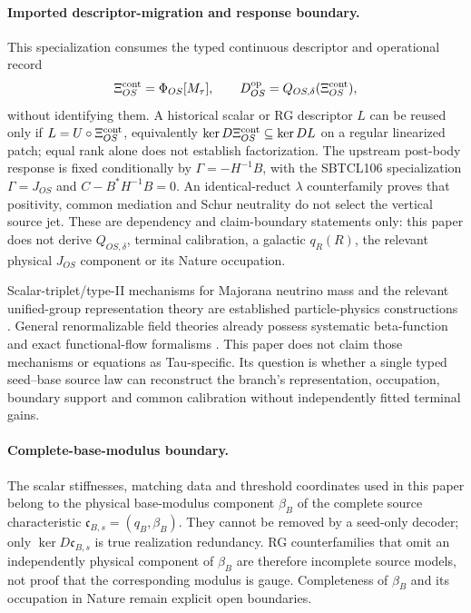 \documentclass[11pt]{article}
\begin{document}
\paragraph{Imported descriptor-migration and response boundary.}
This specialization consumes the typed continuous descriptor and operational
record
\begin{equation}
 \Xi_{OS}^{\rm cont}=\Phi_{OS}[M_\tau],
 \qquad D_{OS}^{\rm op}=Q_{OS,\delta}(\Xi_{OS}^{\rm cont}),
 \label{eq:viic-cont-operational}
\end{equation}
without identifying them.  A historical scalar or RG descriptor $L$ can be
reused only if $L=U\circ\Xi_{OS}^{\rm cont}$, equivalently
$\ker D\Xi_{OS}^{\rm cont}\subseteq\ker DL$ on a regular linearized patch;
equal rank alone does not establish factorization.  The upstream post-body
response is fixed conditionally by $\Gamma=-H^{-1}B$, with the SBTCL106
specialization $\Gamma=J_{OS}$ and $C-B^*H^{-1}B=0$.  An identical-reduct
$\lambda$ counterfamily proves that positivity, common mediation and Schur
neutrality do not select the vertical source jet.  These are dependency and
claim-boundary statements only: this paper does not derive $Q_{OS,\delta}$,
terminal calibration, a galactic $q_R(R)$, the relevant physical $J_{OS}$
component or its Nature occupation.

Scalar-triplet/type-II mechanisms for Majorana neutrino mass and the relevant
unified-group representation theory are established particle-physics
constructions \cite{MaggWetterich1980,SchechterValle1980,Slansky1981}. General
renormalizable field theories already possess systematic beta-function and
exact functional-flow formalisms \cite{MachacekVaughn1985,Wetterich1993}.
This paper does not claim those mechanisms or equations as Tau-specific. Its
question is whether a single typed seed--base source law can reconstruct the
branch's representation, occupation, boundary support and common calibration
without independently fitted terminal gains.





\paragraph{Complete-base-modulus boundary.}
The scalar stiffnesses, matching data and threshold coordinates used in this
paper belong to the physical base-modulus component $\beta_B$ of the complete
source characteristic $\mathfrak c_{B,s}=(q_B,\beta_B)$. They cannot be
removed by a seed-only decoder; only $\ker D\mathfrak c_{B,s}$ is true
realization redundancy. RG counterfamilies that omit an independently
physical component of $\beta_B$ are therefore incomplete source models, not
proof that the corresponding modulus is gauge. Completeness of $\beta_B$ and
its occupation in Nature remain explicit open boundaries.
\end{document}

